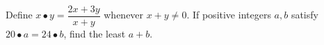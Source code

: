 Define $x\bullet y=\dfrac{2x+3y}{x+y}$ whenever $x+y\ne0$. If positive integers $a,b$ satisfy $20\bullet a=24\bullet b$, find the least $a+b$.
